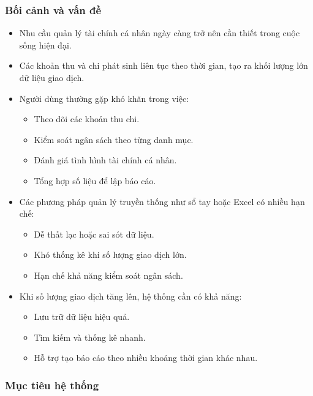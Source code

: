 \documentclass[12pt,letterpaper]{article}
\begin{document}
\subsubsection{Bối cảnh và vấn đề}

\begin{itemize}
\item Nhu cầu quản lý tài chính cá nhân ngày càng trở nên cần thiết trong cuộc sống hiện đại.

\item Các khoản thu và chi phát sinh liên tục theo thời gian, tạo ra khối lượng lớn dữ liệu giao dịch.

\item Người dùng thường gặp khó khăn trong việc:
\begin{itemize}
    \item Theo dõi các khoản thu chi.
    \item Kiểm soát ngân sách theo từng danh mục.
    \item Đánh giá tình hình tài chính cá nhân.
    \item Tổng hợp số liệu để lập báo cáo.
\end{itemize}

\item Các phương pháp quản lý truyền thống như sổ tay hoặc Excel có nhiều hạn chế:
\begin{itemize}
    \item Dễ thất lạc hoặc sai sót dữ liệu.
    \item Khó thống kê khi số lượng giao dịch lớn.
    \item Hạn chế khả năng kiểm soát ngân sách.
\end{itemize}

\item Khi số lượng giao dịch tăng lên, hệ thống cần có khả năng:
\begin{itemize}
    \item Lưu trữ dữ liệu hiệu quả.
    \item Tìm kiếm và thống kê nhanh.
    \item Hỗ trợ tạo báo cáo theo nhiều khoảng thời gian khác nhau.
\end{itemize}

\end{itemize}

\subsubsection{Mục tiêu hệ thống}
\end{document}
